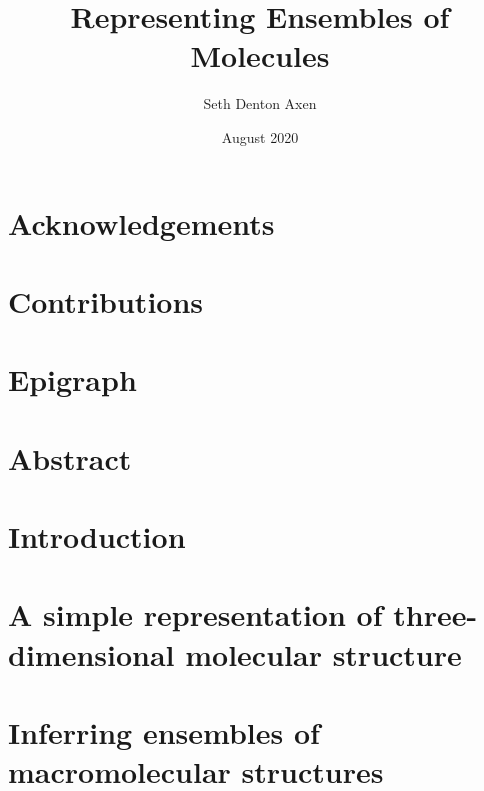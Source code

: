 \documentclass[12pt,twoside]{report}
\title{Representing Ensembles of Molecules}
\author{Seth Denton Axen}
\date{August 2020}
\begin{document}
\pagestyle{plain} %

{}
\setcounter{page}{2}



\doublespacing

\chapter*{Acknowledgements}


\chapter*{Contributions}


\chapter*{Epigraph}


\chapter*{Abstract}


\tableofcontents

\listoffigures

\listoftables

\clearpage
\pagestyle{fancy} %
\setcounter{page}{1}

\chapter{Introduction}


\chapter{A simple representation of three-dimensional molecular structure}
\label{e3fp-paper}


\chapter{Inferring ensembles of macromolecular structures}
\label{ensemble-inference}

\end{document}
